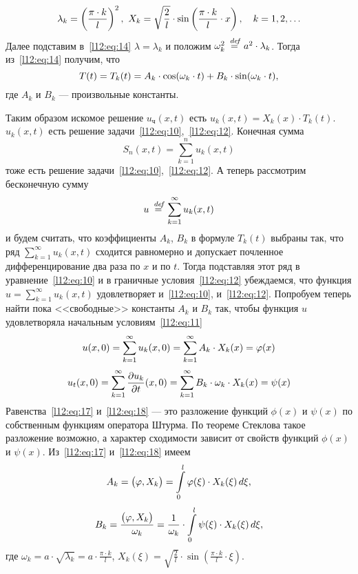 \documentclass[12pt,a4paper,openany,fleqn]{book}
\newcommand {\defeq}{\stackrel{\hspace{0.09 cm}de\!f}{=}}
\newcommand {\eqdef}{\defeq}
\newcommand{\pder}[2]{\ensuremath{\frac{\partial#1}{\partial#2}}}
\theoremstyle{definition}
\begin{document}
\begin{equation*}
	\hfill\lambda_k=\left(\frac{\pi\cdot k}{l}\right)^2,\ X_k=\sqrt{\frac{2}{l}}\cdot\sin\left(\frac{\pi\cdot k}{l}\cdot x\right),\quad k=1,2,\ldots\hfill
\end{equation*}
Далее подставим в~\eqref{l12:eq:14} $\lambda=\lambda_k$ и положим $\omega^2_k\eqdef a^2\cdot\lambda_k$. Тогда из~\eqref{l12:eq:14} получим, что 
\begin{equation*}
	\hfill T(t)=T_k(t)=A_k\cdot\cos(\omega_k\cdot t)+B_k\cdot\sin(\omega_k\cdot t),\hfill
\end{equation*}
где $A_k$ и $B_k$ --- произвольные константы. 

Таким образом искомое решение $u_{\text{ч}}(x,t)$ есть $u_k(x,t)=X_k(x)\cdot T_k(t)$. $u_k(x,t)$ есть решение задачи~\eqref{l12:eq:10},~\eqref{l12:eq:12}. Конечная сумма 
\begin{equation*}
	S_n(x,t)=\sum\limits_{k=1}^n u_k(x,t) 
\end{equation*}
тоже есть решение задачи~\eqref{l12:eq:10},~\eqref{l12:eq:12}. А теперь рассмотрим бесконечную сумму 
\begin{equation*}
	u\eqdef\sum\limits_{k=1}^{\infty}u_k(x,t)
\end{equation*}
и будем считать, что коэффициенты $A_k$, $B_k$ в формуле $T_k(t)$ выбраны так, что ряд $\sum\limits_{k=1}^{\infty}u_k(x,t)$ сходится равномерно и допускает почленное дифференцирование два раза по $x$ и по $t$. Тогда подставляя этот ряд в уравнение~\eqref{l12:eq:10} и в граничные условия~\eqref{l12:eq:12} убеждаемся, что функция $u=\sum\limits_{k=1}^{\infty}u_k(x,t)$ удовлетворяет и~\eqref{l12:eq:10}, и~\eqref{l12:eq:12}. Попробуем теперь найти пока <<свободные>> константы $A_k$ и $B_k$ так, чтобы функция $u$ удовлетворяла начальным условиям~\eqref{l12:eq:11}
\begin{equation}
	\label{l12:eq:17}
	\hfill u(x,0)=\sum\limits_{k=1}^{\infty}u_k(x,0)=\sum\limits_{k=1}^{\infty}A_k\cdot X_k(x)=\phi(x)\hfill
\end{equation}
\begin{equation}
	\label{l12:eq:18}
	\hfill u_t(x,0)=\sum\limits_{k=1}^{\infty}\pder{u_k}{t}(x,0)=\sum\limits_{k=1}^{\infty}B_k\cdot\omega_k\cdot X_k(x)=\psi(x)\hfill
\end{equation}
Равенства~\eqref{l12:eq:17} и~\eqref{l12:eq:18} --- это разложение функций $\phi(x)$ и $\psi(x)$ по собственным функциям оператора Штурма. По теореме Стеклова такое разложение возможно, а характер сходимости зависит от свойств функций $\phi(x)$ и $\psi(x)$. Из~\eqref{l12:eq:17} и~\eqref{l12:eq:18} имеем 
\begin{equation*}
	\hfill A_k=\big(\phi,X_k\big)=\int\limits_0^l\phi(\xi)\cdot X_k(\xi)\,d\xi,\hfill
\end{equation*}
\begin{equation*}
	\hfill B_k=\frac{\big(\phi,X_k\big)}{\omega_k}=\frac{1}{\omega_k}\cdot\int\limits_0^l\psi(\xi)\cdot X_k(\xi)\,d\xi,\hfill
\end{equation*}
где $\omega_k=a\cdot\sqrt{\lambda_k}=a\cdot\frac{\pi\cdot k}{l}$, $X_k(\xi)=\sqrt{\frac{2}{l}}\cdot\sin\left(\frac{\pi\cdot k}{l}\cdot\xi\right)$.
\end{document}
